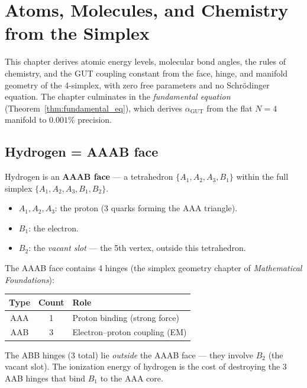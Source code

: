 \section{Atoms, Molecules, and Chemistry from the Simplex}
\label{ch:atoms}

This chapter derives atomic energy levels, molecular bond angles, the rules of chemistry, and the GUT coupling constant from the face, hinge, and manifold geometry of the 4-simplex, with zero free parameters and no Schr\"odinger equation.  The chapter culminates in the \emph{fundamental equation} (Theorem~\ref{thm:fundamental_eq}), which derives $\alpha_\text{GUT}$ from the flat $N=4$ manifold to $0.001\%$ precision.

\subsection{Hydrogen = AAAB face}

Hydrogen is an \textbf{AAAB face} --- a tetrahedron $\{A_1, A_2, A_3, B_1\}$ within the full simplex $\{A_1, A_2, A_3, B_1, B_2\}$.

\begin{itemize}
\item $A_1, A_2, A_3$: the proton (3 quarks forming the AAA triangle).
\item $B_1$: the electron.
\item $B_2$: the \emph{vacant slot} --- the 5th vertex, outside this tetrahedron.
\end{itemize}

The AAAB face contains 4 hinges (the simplex geometry chapter of \textit{Mathematical Foundations}):
\begin{center}
\begin{tabular}{ccl}
\hline
Type & Count & Role \\
\hline
AAA & 1 & Proton binding (strong force) \\
AAB & 3 & Electron--proton coupling (EM) \\
\hline
\end{tabular}
\end{center}

The ABB hinges (3 total) lie \emph{outside} the AAAB face --- they involve $B_2$ (the vacant slot). The ionization energy of hydrogen is the cost of destroying the 3 AAB hinges that bind $B_1$ to the AAA core.

